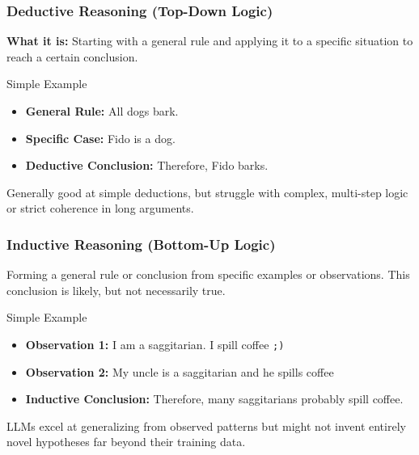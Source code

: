 \begin{frame}
\frametitle{Deductive Reasoning (Top-Down Logic)}

\textbf{What it is:} Starting with a general rule and applying it to a specific situation to reach a certain conclusion.

\bigskip %

\begin{block}{Simple Example}
  \begin{itemize}
    \item \textbf{General Rule:} All dogs bark.
    \item \textbf{Specific Case:} Fido is a dog.
    \item \textbf{Deductive Conclusion:} Therefore, Fido barks.
  \end{itemize}
\end{block}

\bigskip

Generally good at simple deductions, but struggle with complex, multi-step logic or strict coherence in long arguments.
\end{frame}

\begin{frame}[fragile]
\frametitle{Inductive Reasoning (Bottom-Up Logic)}

Forming a general rule or conclusion from specific examples or observations. This conclusion is likely, but not necessarily true.

\bigskip

\begin{block}{Simple Example}
  \begin{itemize}
    \item \textbf{Observation 1:} I am a saggitarian. I spill coffee \verb|;)|
    \item \textbf{Observation 2:} My uncle is a saggitarian and he spills coffee
    \item \textbf{Inductive Conclusion:} Therefore, many saggitarians probably spill coffee.
  \end{itemize}
\end{block}

\bigskip

LLMs excel at generalizing from observed patterns but might not invent entirely novel hypotheses far beyond their training data.
\end{frame}

